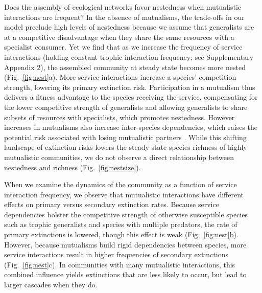 \documentclass[twocolumn,preprintnumbers,amsmath,amssymb,superscriptaddress,linenumbers]{revtex4-1}
\begin{document}
Does the assembly of ecological networks favor nestedness when mutualistic interactions are frequent?
In the absence of mutualisms, the trade-offs in our model preclude high levels of nestedness because we assume that generalists are at a competitive disadvantage when they share the same resources with a specialist consumer.
Yet we find that as we increase the frequency of service interactions (holding constant trophic interaction frequency; see Supplementary Appendix 2), the assembled community at steady state becomes more nested (Fig.\ \ref{fig:nest}a).
More service interactions increase a species' competition strength, lowering its primary extinction risk.
Participation in a mutualism thus delivers a fitness advantage to the species receiving the service, compensating for the lower competitive strength of generalists and allowing generalists to share subsets of resources with specialists, which promotes nestedness.
However increases in mutualisms also increase inter-species dependencies, which raises the potential risk associated with losing mutualistic partners \cite{Bond1994,Colwell2012}. %
While this shifting landscape of extinction risks lowers the steady state species richness of highly mutualistic communities, we do not observe a direct relationship between nestedness and richness (Fig.\ \ref{fig:nestsize}).

When we examine the dynamics of the community as a function of service interaction frequency, we observe that mutualistic interactions have different effects on primary versus secondary extinction rates.
Because service dependencies bolster the competitive strength of otherwise susceptible species such as trophic generalists and species with multiple predators, the rate of primary extinctions is lowered, though this effect is weak (Fig.\ \ref{fig:nest}b).
However, because mutualisms build rigid dependencies between species, more service interactions result in higher frequencies of secondary extinctions (Fig.\ \ref{fig:nest}c). 
In communities with many mutualistic interactions, this combined influence yields extinctions that are less likely to occur, but lead to larger cascades when they do.
\end{document}
